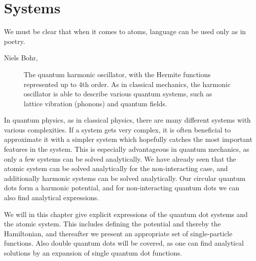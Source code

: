 \chapter{Systems} \label{chp:systems}
\epigraph{We must be clear that when it comes to atoms, language can be used only as in poetry.}{Niels Bohr, \cite{heisenberg_physics_1971}}
\begin{figure}[H]
	\centering
	
	\caption{The quantum harmonic oscillator, with the Hermite functions represented up to 4th order. As in classical mechanics, the harmonic oscillator is able to describe various quantum systems, such as lattice vibration (phonons) and quantum fields.}
	\label{fig:harmonicoscillator}
\end{figure}

In quantum physics, as in classical physics, there are many different systems with various complexities. If a system gets very complex, it is often beneficial to approximate it with a simpler system which hopefully catches the most important features in the system. This is especially advantageous in quantum mechanics, as only a few systems can be solved analytically. We have already seen that the atomic system can be solved analytically for the non-interacting case, and additionally harmonic systems can be solved analytically. Our circular quantum dots form a harmonic potential, and for non-interacting quantum dots we can also find analytical expressions. 

We will in this chapter give explicit expressions of the quantum dot systems and the atomic system. This includes defining the potential and thereby the Hamiltonian, and thereafter we present an appropriate set of single-particle functions. Also double quantum dots will be covered, as one can find analytical solutions by an expansion of single quantum dot functions.

